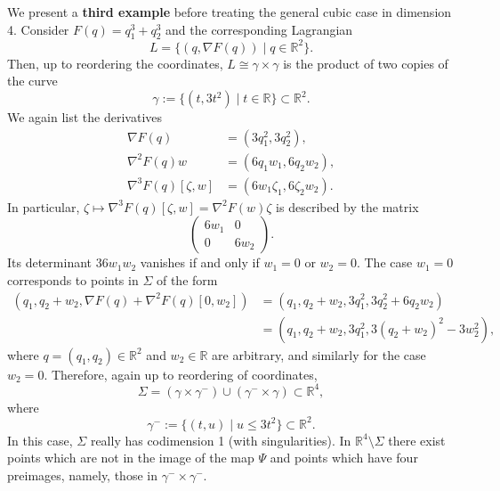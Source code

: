 \documentclass[12pt]{article}
\newcommand{\g}{{\gamma}}
\newcommand{\R}{{\mathbb R}}
\begin{document}
We present a \textbf{third example} before treating the general cubic case in dimension 4. Consider $F(q)=q_1^3+q_2^3$ and the corresponding Lagrangian 
\begin{equation}\nonumber
L=\{(q,\nabla F(q))\mid q\in\R^2\}.
\end{equation}
Then, up to reordering the coordinates, $L\cong\gamma\times\gamma$ is the product of two copies of the curve
\begin{equation}\nonumber
\g:=\{(t,3t^2)\mid t\in \R\}\subset\R^2.
\end{equation}
We again list the derivatives
\begin{equation}\nonumber
\begin{aligned}
\nabla F(q)&=(3q_1^2,3q_2^2),\\
\nabla^2F(q)w&=(6q_1w_1,6q_2w_2),\\
\nabla^3F(q)[\zeta,w]&=(6w_1\zeta_1,6\zeta_2w_2).
\end{aligned}
\end{equation}
In particular, $\zeta\mapsto\nabla^3F(q)[\zeta,w]=\nabla^2F(w)\zeta$ is described by the matrix
\begin{equation}\nonumber
\begin{pmatrix}
6w_1 & 0\\
0 & 6w_2
\end{pmatrix}.
\end{equation}
Its determinant $36w_1w_2$ vanishes if and only if $w_1=0$ or $w_2=0$. The case $w_1=0$ corresponds to points in $\Sigma$ of the form
\begin{equation}\nonumber
\begin{aligned}
(q_1,q_2+w_2,\nabla F(q)+\nabla^2F(q)[0,w_2])&=(q_1,q_2+w_2,3q_1^2,3q_2^2+6q_2w_2)\\
&=(q_1,q_2+w_2,3q_1^2,3(q_2+w_2)^2-3w_2^2),
\end{aligned}
\end{equation}
where $q=(q_1,q_2)\in\R^2$ and $w_2\in\R$ are arbitrary, and similarly for the case $w_2=0$.
Therefore, again up to reordering of coordinates,
\begin{equation}\nonumber
\Sigma=(\gamma\times\gamma^-)\cup(\gamma^-\times\gamma)\subset \R^4,
\end{equation}
where
\begin{equation}\nonumber
\gamma^-:=\{(t,u)\mid u\leq 3t^2\}\subset \R^2.
\end{equation}
In this case, $\Sigma$ really has codimension 1 (with singularities). In $\R^4\setminus \Sigma$ there exist points which are not in the image of the map $\Psi$ and points which have four preimages, namely, those in $\gamma^-\times\gamma^-$.
\end{document}

